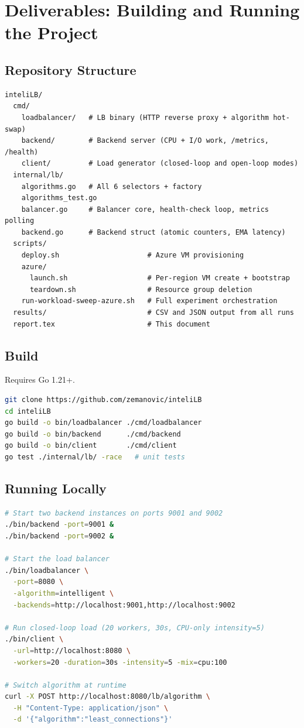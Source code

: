 \documentclass[12pt]{article}
\begin{document}
\section{Deliverables: Building and Running the Project}

\subsection{Repository Structure}

\begin{lstlisting}
inteliLB/
  cmd/
    loadbalancer/   # LB binary (HTTP reverse proxy + algorithm hot-swap)
    backend/        # Backend server (CPU + I/O work, /metrics, /health)
    client/         # Load generator (closed-loop and open-loop modes)
  internal/lb/
    algorithms.go   # All 6 selectors + factory
    algorithms_test.go
    balancer.go     # Balancer core, health-check loop, metrics polling
    backend.go      # Backend struct (atomic counters, EMA latency)
  scripts/
    deploy.sh                     # Azure VM provisioning
    azure/
      launch.sh                   # Per-region VM create + bootstrap
      teardown.sh                 # Resource group deletion
    run-workload-sweep-azure.sh   # Full experiment orchestration
  results/                        # CSV and JSON output from all runs
  report.tex                      # This document
\end{lstlisting}

\subsection{Build}

Requires Go 1.21+.

\begin{lstlisting}[language=bash]
git clone https://github.com/zemanovic/inteliLB
cd inteliLB
go build -o bin/loadbalancer ./cmd/loadbalancer
go build -o bin/backend      ./cmd/backend
go build -o bin/client       ./cmd/client
go test ./internal/lb/ -race   # unit tests
\end{lstlisting}

\subsection{Running Locally}

\begin{lstlisting}[language=bash]
# Start two backend instances on ports 9001 and 9002
./bin/backend -port=9001 &
./bin/backend -port=9002 &

# Start the load balancer
./bin/loadbalancer \
  -port=8080 \
  -algorithm=intelligent \
  -backends=http://localhost:9001,http://localhost:9002

# Run closed-loop load (20 workers, 30s, CPU-only intensity=5)
./bin/client \
  -url=http://localhost:8080 \
  -workers=20 -duration=30s -intensity=5 -mix=cpu:100

# Switch algorithm at runtime
curl -X POST http://localhost:8080/lb/algorithm \
  -H "Content-Type: application/json" \
  -d '{"algorithm":"least_connections"}'
\end{lstlisting}
\end{document}
